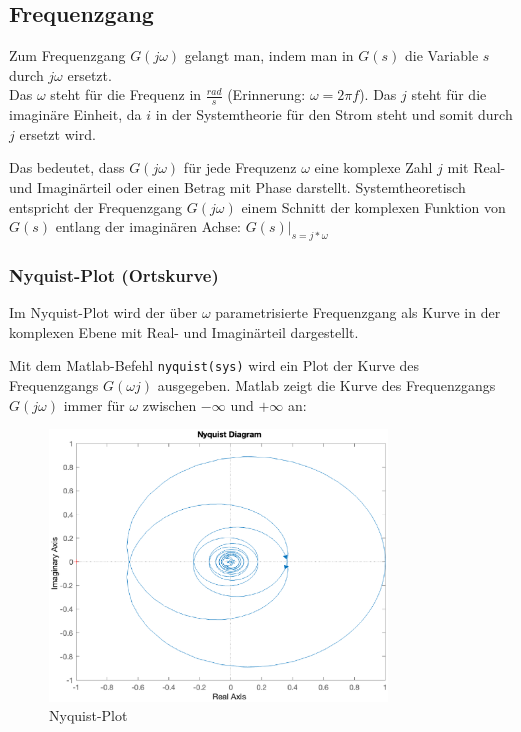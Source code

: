 \subsection{Frequenzgang}
Zum Frequenzgang $G(j \omega)$ gelangt man, indem man in $G(s)$ die Variable $s$ durch $j \omega$ ersetzt.\\
Das $\omega$ steht für die Frequenz in $\frac{rad}{s}$ (Erinnerung: $\omega = 2\pi f$). Das $j$ steht für die imaginäre Einheit, da $i$ in der Systemtheorie für den Strom steht und somit durch $j$ ersetzt wird.

Das bedeutet, dass $G(j \omega)$ für jede Frequzenz $\omega$ eine komplexe Zahl $j$ mit Real- und Imaginärteil oder einen Betrag mit Phase darstellt.
Systemtheoretisch entspricht der Frequenzgang $G(j\omega)$ einem Schnitt der komplexen Funktion von $G(s)$ entlang der imaginären Achse: $G(s)|_{s = j * \omega}$

\subsubsection{Nyquist-Plot (Ortskurve)}
Im Nyquist-Plot wird der über $\omega$ parametrisierte Frequenzgang als Kurve in der komplexen Ebene mit Real- und Imaginärteil dargestellt.

Mit dem Matlab-Befehl \texttt{nyquist(sys)} wird ein Plot der Kurve des Frequenzgangs $G(\omega j)$ ausgegeben. 
Matlab zeigt die Kurve des Frequenzgangs $G(j\omega)$ immer für $\omega$ zwischen $- \infty$ und $+ \infty$ an:

\begin{figure}[H]
    \label{fig:nyquist}
    \centering
    \includegraphics[width=0.8\textwidth]{Bilder/NyquistPT1Tt.eps}
    \caption{Nyquist-Plot}
 \end{figure}

